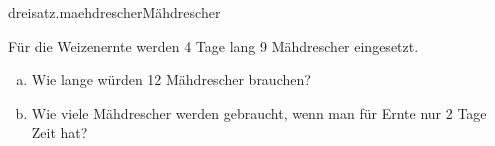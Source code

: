 \begin{exercise}{dreisatz.maehdrescher}{Mähdrescher}
  \ifproblem\problem\par
    Für die Weizenernte werden 4 Tage lang 9 Mähdrescher eingesetzt.
    \begin{enumerate}[a)]
      \item Wie lange würden 12 Mähdrescher brauchen?
      \item Wie viele Mähdrescher werden gebraucht, wenn man für Ernte nur 2 Tage Zeit hat?
    \end{enumerate}
  \fi
\end{exercise}
